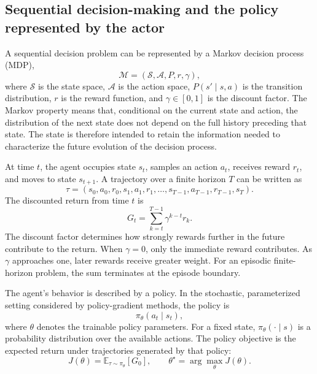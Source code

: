 \subsection{Sequential decision-making and the policy represented by the actor}
\label{subsec:ac-policy-actor}

A sequential decision problem can be represented by a Markov decision process
(MDP),
\begin{equation}
    \mathcal{M}
    =
    (\mathcal{S},\mathcal{A},P,r,\gamma),
    \label{eq:ac-mdp}
\end{equation}
where \(\mathcal{S}\) is the state space, \(\mathcal{A}\) is the action space,
\(P(s'\mid s,a)\) is the transition distribution, \(r\) is the reward
function, and \(\gamma\in[0,1]\) is the discount factor. The Markov property
means that, conditional on the current state and action, the distribution of
the next state does not depend on the full history preceding that state. The
state is therefore intended to retain the information needed to characterize
the future evolution of the decision process.

At time \(t\), the agent occupies state \(s_t\), samples an action \(a_t\),
receives reward \(r_t\), and moves to state \(s_{t+1}\). A trajectory over a
finite horizon \(T\) can be written as
\begin{equation}
    \tau
    =
    (s_0,a_0,r_0,s_1,a_1,r_1,\ldots,s_{T-1},a_{T-1},r_{T-1},s_T).
    \label{eq:ac-trajectory}
\end{equation}
The discounted return from time \(t\) is
\begin{equation}
    G_t
    =
    \sum_{k=t}^{T-1}
    \gamma^{k-t}r_k.
    \label{eq:ac-return}
\end{equation}
The discount factor determines how strongly rewards further in the future
contribute to the return. When \(\gamma=0\), only the immediate reward
contributes. As \(\gamma\) approaches one, later rewards receive greater
weight. For an episodic finite-horizon problem, the sum terminates at the
episode boundary.

The agent's behavior is described by a policy. In the stochastic,
parameterized setting considered by policy-gradient methods, the policy is
\begin{equation}
    \pi_\theta(a_t\mid s_t),
    \label{eq:ac-policy}
\end{equation}
where \(\theta\) denotes the trainable policy parameters. For a fixed state,
\(\pi_\theta(\cdot\mid s)\) is a probability distribution over the available
actions. The policy objective is the expected return under trajectories
generated by that policy:
\begin{equation}
    J(\theta)
    =
    \mathbb{E}_{\tau\sim\pi_\theta}[G_0],
    \qquad
    \theta^\star
    =
    \arg\max_\theta J(\theta).
    \label{eq:ac-objective}
\end{equation}

